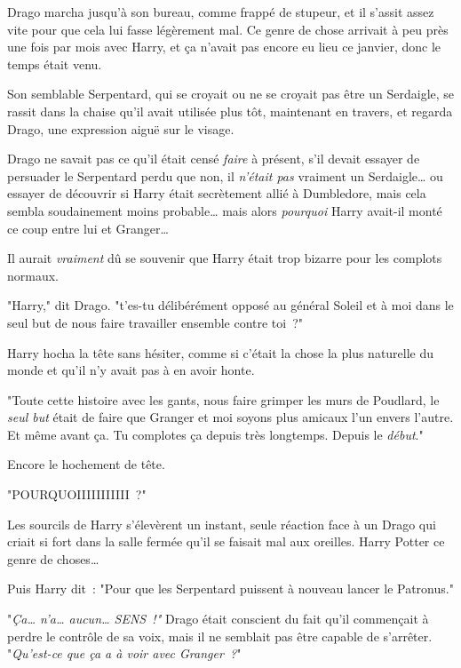 Drago marcha jusqu'à son bureau, comme frappé de stupeur, et il s'assit assez vite pour que cela lui fasse légèrement mal. Ce genre de chose arrivait à peu près une fois par mois avec Harry, et ça n'avait pas encore eu lieu ce janvier, donc le temps était venu.

Son semblable Serpentard, qui se croyait ou ne se croyait pas être un Serdaigle, se rassit dans la chaise qu'il avait utilisée plus tôt, maintenant en travers, et regarda Drago, une expression aiguë sur le visage.

Drago ne savait pas ce qu'il était censé \emph{faire} à présent, s'il devait essayer de persuader le Serpentard perdu que non, il \emph{n'était pas} vraiment un Serdaigle… ou essayer de découvrir si Harry était secrètement allié à Dumbledore, mais cela sembla soudainement moins probable… mais alors \emph{pourquoi} Harry avait-il monté ce coup entre lui et Granger…

Il aurait \emph{vraiment} dû se souvenir que Harry était trop bizarre pour les complots normaux.

"Harry," dit Drago. "t'es-tu délibérément opposé au général Soleil et à moi dans le seul but de nous faire travailler ensemble contre toi~?"

Harry hocha la tête sans hésiter, comme si c'était la chose la plus naturelle du monde et qu'il n'y avait pas à en avoir honte.

"Toute cette histoire avec les gants, nous faire grimper les murs de Poudlard, le \emph{seul but} était de faire que Granger et moi soyons plus amicaux l'un envers l'autre. Et même avant ça. Tu complotes ça depuis très longtemps. Depuis le \emph{début}."

Encore le hochement de tête.

"POURQUOIIIIIIIIIII~?"

Les sourcils de Harry s'élevèrent un instant, seule réaction face à un Drago qui criait si fort dans la salle fermée qu'il se faisait mal aux oreilles.  Harry Potter  ce genre de choses…

Puis Harry dit~: "Pour que les Serpentard puissent à nouveau lancer le Patronus."

"\emph{Ça… n'a… aucun… SENS~!"} Drago était conscient du fait qu'il commençait à perdre le contrôle de sa voix, mais il ne semblait pas être capable de s'arrêter. "\emph{Qu'est-ce que ça a à voir avec Granger~?}"

